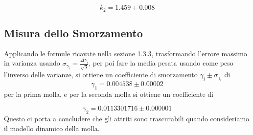 \documentclass[a4paper]{article}
\begin{document}
{\begin{equation}
    \bar{k}_2 = 1.459\pm{0.008}
\end{equation}

\subsection{Misura dello Smorzamento}
Applicando le formule ricavate nella sezione 1.3.3, trasformando l'errore massimo in varianza usando $\sigma_{\gamma_i} = \frac{\Delta \gamma_i}{\sqrt{3}}$, per poi fare la media pesata usando come peso l'inverso delle varianze, si ottiene un coefficiente di smorzamento $\gamma_i \pm{\sigma_{\gamma_i}}$ di
\begin{equation}
    \gamma_1 = 0.004538\pm{0.00002}
\end{equation}
per la prima molla, e per la seconda molla si ottiene un coefficiente di 

\begin{equation}
    \gamma_2 = 0.0113301716\pm{0.000001}
\end{equation}
Questo ci porta a concludere che gli attriti sono trascurabili quando consideriamo il modello dinamico della molla.

}
\end{document}

